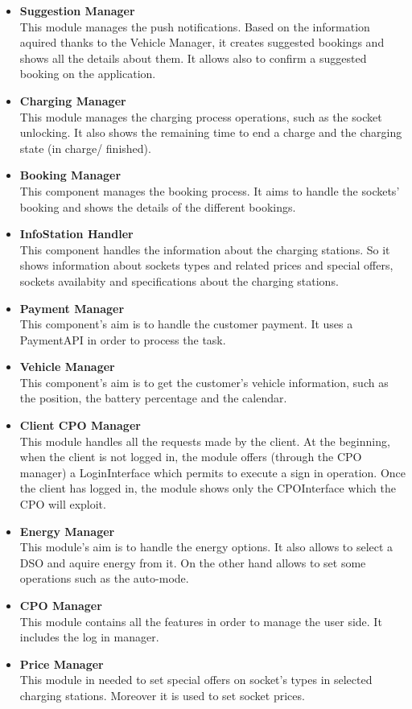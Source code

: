 \begin{itemize}
    \item \textbf{Suggestion Manager}\\This module manages the push notifications. Based on the information aquired thanks to the Vehicle Manager, it creates suggested bookings and shows all the details about them. It allows also to confirm a suggested booking on the application.
    \item \textbf{Charging Manager}\\ This module manages the charging process operations, such as the socket unlocking. It also shows the remaining time to end a charge and the charging state (in charge/ finished).
    \item \textbf{Booking Manager}\\This component manages the booking process. It aims to handle the sockets' booking and shows the details of the different bookings.
    \item \textbf{InfoStation Handler}\\This component handles the information about the charging stations. So it shows information about sockets types and related prices and special offers, sockets availabity and specifications about the charging stations.
    \item \textbf{Payment Manager}\\This component's aim is to handle the customer payment. It uses a PaymentAPI in order to process the task.
    \item \textbf{Vehicle Manager}\\This component's aim is to get the customer's vehicle information, such as the position, the battery percentage and the calendar.
    \item \textbf{Client CPO Manager}\\This module handles all the requests made by the client. At the beginning, when the client is not logged in, the module offers (through the CPO manager) a LoginInterface which permits to execute a sign in operation. Once the client has logged in, the module shows only the CPOInterface which the CPO will exploit.
    \item \textbf{Energy Manager}\\This module's aim is to handle the energy options.
    It also allows to select a DSO and aquire energy from it. On the other hand allows to set some operations such as the auto-mode.
    \item \textbf{CPO Manager}\\This module contains all the features in order to manage the user side. It includes the log in manager.
    \item \textbf{Price Manager}\\This module in needed to set special offers on socket's types in selected charging stations. Moreover it is used to set socket prices.
   

\end{itemize}
